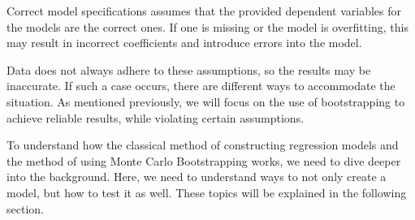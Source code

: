 \noindent Correct model specifications assumes that the provided dependent variables for the models are the correct ones. If one is missing or the model is overfitting, this may result in incorrect coefficients and introduce errors into the model. \newline

\noindent Data does not always adhere to these assumptions, so the results may be inaccurate. 
If such a case occurs, there are different ways to accommodate the situation. As mentioned previously, we will focus on the use of bootstrapping to achieve reliable results, while violating certain assumptions. \newline 

\noindent To understand how the classical method of constructing regression models and the method of using Monte Carlo Bootstrapping works, we need to dive deeper into the background. Here, we need to understand ways to not only create a model, but how to test it as well. These topics will be explained in the following section.

